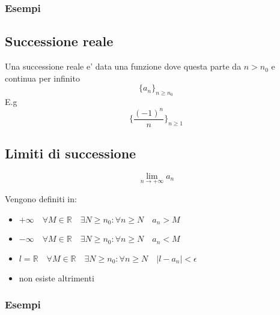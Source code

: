 \documentclass{article}
\begin{document}
\begin{flushleft}
        \subsubsection{Esempi}
        \subsection{Successione reale}
        \begin{flushleft}
            Una successione reale e' data una funzione dove questa parte da $n>n_0$ e continua per infinito
            \begin{equation}
                \{ a_n \}_{n \geq n_0}
            \end{equation}
            E.g
            \begin{equation}
                \{ \frac{(-1)^n}{n} \}_{n \geq 1}
            \end{equation}
        \end{flushleft}
        \subsection{Limiti di successione}
        \begin{flushleft}
            \begin{equation}
                \lim_{n \to +\infty} a_n
            \end{equation}
            \begin{flushleft}
               Vengono definiti in:
               \begin{itemize}
                   \item $ +\infty \quad \forall M \in \mathbb{R} \quad \exists N \geq n_0:\forall n \geq N \quad a_n > M$
                   \item $ -\infty \quad \forall M \in \mathbb{R} \quad \exists N \geq n_0:\forall n \geq N \quad a_n < M$
                   \item $ l=\mathbb{R} \quad \forall M \in \mathbb{R} \quad \exists N \geq n_0:\forall n \geq N \quad |l-a_n|<\epsilon$
                   \item non esiste altrimenti
               \end{itemize}
            \subsubsection{Esempi}
            \begin{flushleft}
            \end{flushleft}

\end{flushleft}
\end{flushleft}
\end{flushleft}
\end{document}
